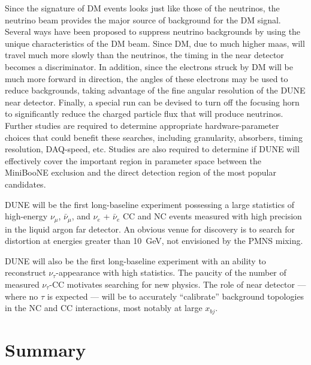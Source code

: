 Since the signature of DM events looks just like those of the
neutrinos, the neutrino beam provides the major source of background
for the DM signal. Several ways have been proposed to suppress
neutrino backgrounds by using the unique characteristics of the DM
beam. Since DM, due to much higher maas, will travel much more slowly
than the neutrinos, the timing in the near detector becomes a
discriminator.  In addition, since the electrons struck by DM will be
much more forward in direction, the angles of these electrons may be
used to reduce backgrounds, taking advantage of the fine angular
resolution of the DUNE near detector.  Finally, a special run can be
devised to turn off the focusing horn to significantly reduce the
charged particle flux that will produce neutrinos. Further studies are
required to determine appropriate hardware-parameter choices that
could benefit these searches, including granularity, absorbers, timing
resolution, DAQ-speed, etc. Studies are also required to determine if
DUNE will effectively cover the important region in parameter space
between the MiniBooNE exclusion and the direct detection region of the
most popular candidates.
 
DUNE will be the first long-baseline experiment possessing a large
statistics of high-energy $\nu_\mu$, $\bar \nu_\mu$, and $\nu_e$ +
$\bar \nu_e$ CC and NC events measured with high precision in the
liquid argon far detector. An obvious venue for discovery is to search
for distortion at energies greater than 10~GeV, not envisioned by the
PMNS mixing.

DUNE will also be the first long-baseline experiment with an ability
to reconstruct $\nu_\tau$-appearance with high statistics. The paucity
of the number of measured $\nu_\tau$-CC motivates searching for new
physics.  The role of near detector --- where no $\tau$ is expected
--- will be to accurately ``calibrate'' background topologies in the
NC and CC interactions, most notably at large $x_{bj}$.


\section{Summary}
\label{sec:physics-nd-summary}


